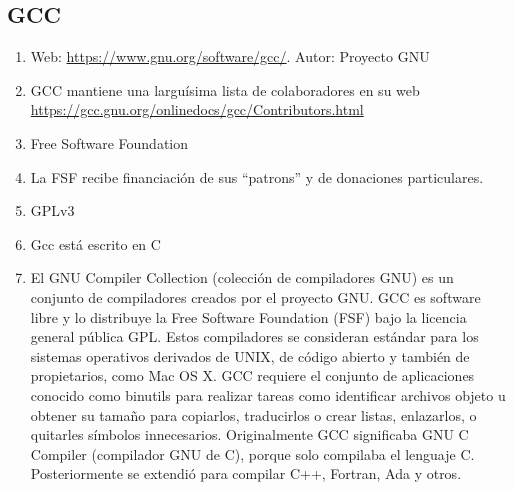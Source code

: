 \subsection{GCC}
\begin{enumerate}
    \item Web: \url{https://www.gnu.org/software/gcc/}. Autor: Proyecto  GNU
    \item GCC mantiene una larguísima lista de colaboradores en su web \\\url{https://gcc.gnu.org/onlinedocs/gcc/Contributors.html}
    \item Free Software Foundation
    \item La FSF recibe financiación de sus ``patrons'' y de donaciones particulares.
    \item GPLv3
    \item Gcc está escrito en C
    \item El GNU Compiler Collection (colección de compiladores GNU) es un conjunto de compiladores creados por el proyecto GNU. GCC es software libre y lo distribuye la Free Software Foundation (FSF) bajo la licencia general pública GPL. Estos compiladores se consideran estándar para los sistemas operativos derivados de UNIX, de código abierto y también de propietarios, como Mac OS X. GCC requiere el conjunto de aplicaciones conocido como binutils para realizar tareas como identificar archivos objeto u obtener su tamaño para copiarlos, traducirlos o crear listas, enlazarlos, o quitarles símbolos innecesarios. Originalmente GCC significaba GNU C Compiler (compilador GNU de C), porque solo compilaba el lenguaje C. Posteriormente se extendió para compilar C++, Fortran, Ada y otros.
\end{enumerate}


